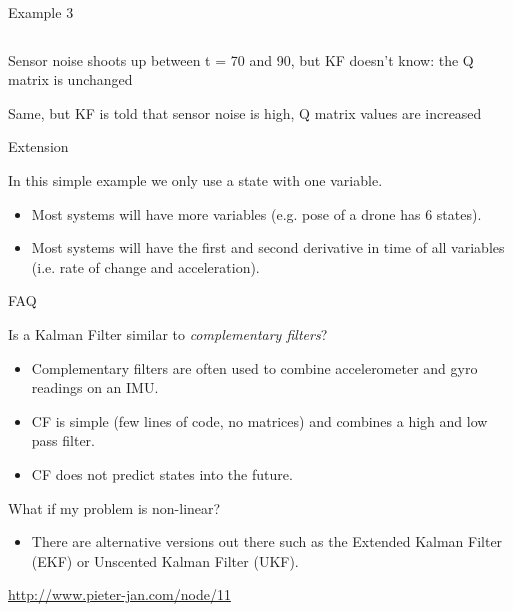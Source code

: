 \documentclass[compress]{beamer}
\begin{document}
\begin{frame}{Example 3}
\begin{columns}
\begin{column}{0.5\linewidth}
\begin{center}
            \end{center}
        \end{column}
    \end{columns}


Sensor noise shoots up between t = 70 and 90, but KF doesn't know: the Q
matrix is unchanged

Same, but KF is told that sensor noise is high, Q matrix values are
increased

\end{frame}

\begin{frame}{Extension}

In this simple example we only use a state with one variable.

\begin{itemize}
    \item Most systems will have more variables (e.g. pose of a drone has 6
  states).
    \item Most systems will have the first and second derivative in time of all
  variables (i.e. rate of change and acceleration).
\end{itemize}

\end{frame}

\begin{frame}{FAQ}

Is a Kalman Filter similar to \emph{complementary filters}?

\begin{itemize}
    \item Complementary filters are often used to combine accelerometer and gyro
  readings on an IMU.
    \item CF is simple (few lines of code, no matrices) and combines a high and
  low pass filter.
    \item CF does not predict states into the future.
\end{itemize}

What if my problem is non-linear?

\begin{itemize}
    \item There are alternative versions out there such as the Extended Kalman
  Filter (EKF) or Unscented Kalman Filter (UKF).
\end{itemize}

\url{http://www.pieter-jan.com/node/11}

\end{frame}
\end{document}
